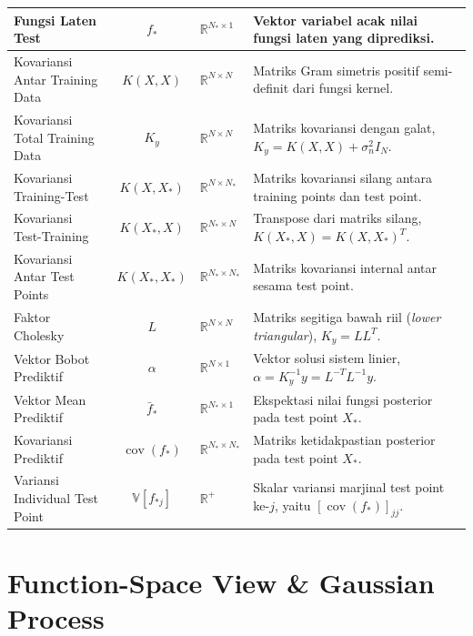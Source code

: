 \documentclass[11pt,a4paper]{article}
\def\boldsymbol#1{#1}%
\def\mathbf#1{#1}%
\begin{document}
\begin{table}[h!]
\begin{tabularx}{\textwidth}{l c l X}
Fungsi Laten Test & $\mathbf{f}_*$ & $\mathbb{R}^{N_* \times 1}$ & Vektor variabel acak nilai fungsi laten yang diprediksi. \\
\midrule
Kovariansi Antar Training Data & $K(X, X)$ & $\mathbb{R}^{N \times N}$ & Matriks Gram simetris positif semi-definit dari fungsi kernel. \\
Kovariansi Total Training Data & $K_y$ & $\mathbb{R}^{N \times N}$ & Matriks kovariansi dengan galat, $K_y = K(X,X) + \sigma_n^2 I_N$. \\
Kovariansi Training-Test & $K(X, X_*)$ & $\mathbb{R}^{N \times N_*}$ & Matriks kovariansi silang antara training points dan test point. \\
Kovariansi Test-Training & $K(X_*, X)$ & $\mathbb{R}^{N_* \times N}$ & Transpose dari matriks silang, $K(X_*, X) = K(X, X_*)^T$. \\
Kovariansi Antar Test Points & $K(X_*, X_*)$ & $\mathbb{R}^{N_* \times N_*}$ & Matriks kovariansi internal antar sesama test point. \\
\midrule
Faktor Cholesky & $L$ & $\mathbb{R}^{N \times N}$ & Matriks segitiga bawah riil (\textit{lower triangular}), $K_y = L L^T$. \\
Vektor Bobot Prediktif & $\boldsymbol{\alpha}$ & $\mathbb{R}^{N \times 1}$ & Vektor solusi sistem linier, $\boldsymbol{\alpha} = K_y^{-1} \mathbf{y} = L^{-T} L^{-1} \mathbf{y}$. \\
Vektor Mean Prediktif & $\bar{\mathbf{f}}_*$ & $\mathbb{R}^{N_* \times 1}$ & Ekspektasi nilai fungsi posterior pada test point $X_*$. \\
Kovariansi Prediktif & $\operatorname{cov}(\mathbf{f}_*)$ & $\mathbb{R}^{N_* \times N_*}$ & Matriks ketidakpastian posterior pada test point $X_*$. \\
Variansi Individual Test Point & $\mathbb{V}[f_{*j}]$ & $\mathbb{R}^+$ & Skalar variansi marjinal test point ke-$j$, yaitu $[\operatorname{cov}(\mathbf{f}_*)]_{jj}$. \\
\bottomrule
\end{tabularx}
\end{table}

\vspace{0.5cm}

\section{Function-Space View \& Gaussian Process}
\label{sec:filosofi}
\end{document}
